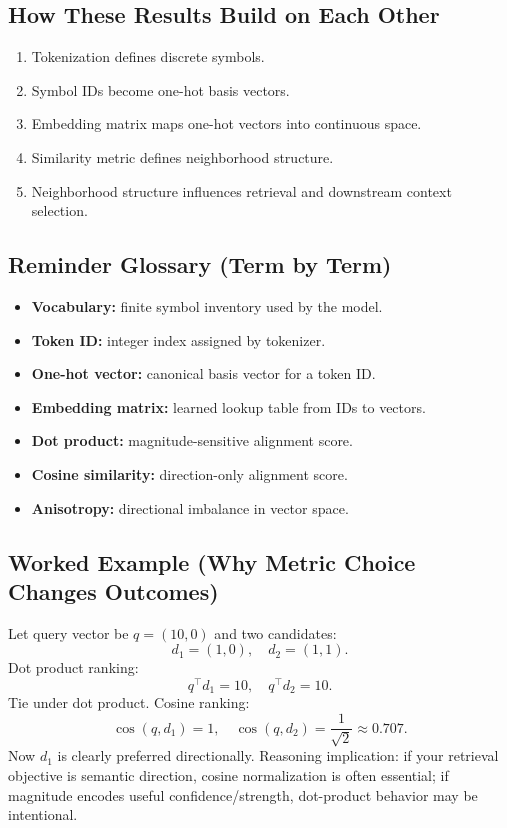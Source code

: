 \subsection*{How These Results Build on Each Other}
\begin{enumerate}[leftmargin=1.5em]
  \item Tokenization defines discrete symbols.
  \item Symbol IDs become one-hot basis vectors.
  \item Embedding matrix maps one-hot vectors into continuous space.
  \item Similarity metric defines neighborhood structure.
  \item Neighborhood structure influences retrieval and downstream context selection.
\end{enumerate}

\subsection*{Reminder Glossary (Term by Term)}
\begin{itemize}[leftmargin=1.5em]
  \item \textbf{Vocabulary:} finite symbol inventory used by the model.
  \item \textbf{Token ID:} integer index assigned by tokenizer.
  \item \textbf{One-hot vector:} canonical basis vector for a token ID.
  \item \textbf{Embedding matrix:} learned lookup table from IDs to vectors.
  \item \textbf{Dot product:} magnitude-sensitive alignment score.
  \item \textbf{Cosine similarity:} direction-only alignment score.
  \item \textbf{Anisotropy:} directional imbalance in vector space.
\end{itemize}

\subsection*{Worked Example (Why Metric Choice Changes Outcomes)}
Let query vector be $q=(10,0)$ and two candidates:
\[
d_1=(1,0),\quad d_2=(1,1).
\]
Dot product ranking:
\[
q^\top d_1 = 10,\quad q^\top d_2 = 10.
\]
Tie under dot product.
Cosine ranking:
\[
\cos(q,d_1)=1,\quad \cos(q,d_2)=\frac{1}{\sqrt{2}}\approx0.707.
\]
Now $d_1$ is clearly preferred directionally.  
Reasoning implication: if your retrieval objective is semantic direction, cosine normalization is often essential; if magnitude encodes useful confidence/strength, dot-product behavior may be intentional.


